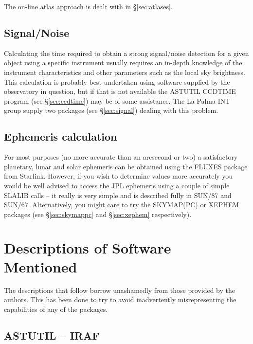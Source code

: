 \documentclass[twoside,11pt]{article}
\newcommand{\htmladdnormallink}[2]{#1}
\newcommand{\xref}[3]{#1}
\newcommand{\xlabel}[1]{}
\newcommand{\SKYMAPPCref}{\htmladdnormallink{SKYMAP(PC)}{http://www.skymap.com}}
\newcommand{\JPLref}{\xref{SUN/87}{sun87}{}}
\newcommand{\SLALIBref}{\xref{SUN/67}{sun67}{}}
\begin{document}
The on-line atlas approach is dealt with in \S{\ref{sec:atlases}}.

\subsection{Signal/Noise} \xlabel{SN}
\label{sec:sn}

Calculating the time required to obtain a strong signal/noise detection
for a given object using a specific instrument usually requires an 
in-depth knowledge of the instrument characteristics and other 
parameters such as the local sky brightness. This calculation is probably 
best undertaken using software supplied by the observatory in question, but 
if that is not available the ASTUTIL CCDTIME program (see \S{\ref{sec:ccdtime}})
may be of some assistance. The 
La Palma INT group supply two packages (see \S{\ref{sec:signal}}) dealing 
with this problem.
  
\subsection{Ephemeris calculation} \xlabel{EPH}
\label{sec:eph}

For most purposes (no more accurate than an arcsecond or two) a satisfactory 
planetary, lunar and solar ephemeris can be obtained using the FLUXES
package from Starlink.
However, if you wish to determine values more accurately you
would be well advised to access the JPL ephemeris using a couple of
simple SLALIB calls -- it really is very simple and is described fully
in {\JPLref} and {\SLALIBref}. Alternatively, you might care to try the {\SKYMAPPCref} or 
XEPHEM packages (see \S{\ref{sec:skymappc}} and \S{\ref{sec:xephem}} respectively).

\section{Descriptions of Software Mentioned} \xlabel{DESOFT}
\label{sec:desoft} 

The descriptions that follow borrow unashamedly from those provided by
the authors. This has been done to try to avoid inadvertently misrepresenting
the capabilities of any of the packages.

\subsection{ASTUTIL -- IRAF} \xlabel{ASTUTIL}
\label{sec:astutil} 
\end{document}
